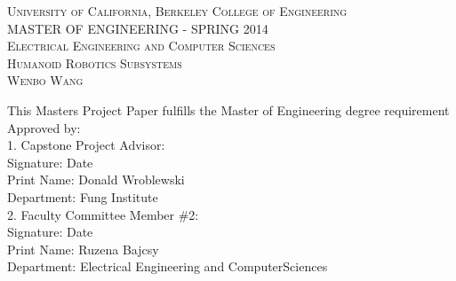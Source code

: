 \begin{titlepage}
\begin{center}


    \textsc{\large University of California, Berkeley College of Engineering}\\[0.5cm]
    \textsc{\Large MASTER OF ENGINEERING - SPRING 2014}\\[1.5cm]

    \textsc{\large Electrical Engineering and Computer Sciences}\\[0.5cm]
    \textsc{\LARGE Humanoid Robotics Subsystems}\\[0.5cm] 
    \textsc{\LARGE Wenbo Wang}\\[1.5cm]

\end{center}

\begin{flushleft}
{
    This Masters Project Paper fulfills the Master of Engineering degree
    requirement\\[0.5cm]
    Approved by:\\[0.5cm]
    1.  Capstone Project Advisor: \\[0.5cm]
    Signature: \underline{\hspace{7cm}} Date \underline{\hspace{3cm}}\\[0.5cm]
    Print Name: Donald Wroblewski\\
    Department: Fung Institute\\[1.5cm]

    2. Faculty Committee Member \#2: \\[0.5cm]
    Signature: \underline{\hspace{7cm}} Date \underline{\hspace{3cm}}\\[0.5cm]
    Print Name: Ruzena Bajcsy\\
    Department: Electrical Engineering and ComputerSciences\\
}
\end{flushleft}

\end{titlepage}
